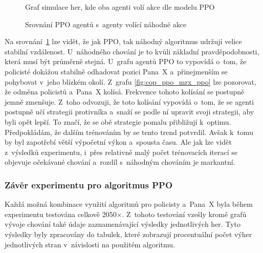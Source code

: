 \begin{figure}[H]
\begin{minipage}{.48\textwidth}
      \caption{Graf simulace her, kde oba agenti volí akce dle modelu PPO}
      \label{fig:cop_ppo_mrx_ppo}
  \end{minipage}
  \caption{Srovnání PPO agentů s~agenty volící náhodné akce}
  \label{fig:srovnani_random_ppo}
  \end{figure}

Na srovnání~\ref{fig:srovnani_random_ppo} lze vidět, že jak PPO, tak náhodný algoritmus udržují velice stabilní vzdálenost.
U~náhodného chování je to kvůli základní pravděpodobnosti, která musí být průměrně stejná.
U~grafu agentů PPO to vypovídá o~tom, že policisté dokážou stabilně odhadovat pozici Pana~X a~přinejmenším se pohybovat v~jeho blízkém okolí.
Z~grafu \ref{fig:cop_ppo_mrx_ppo} lze pozorovat, že odměna policistů a~Pana~X kolísá.
Frekvence tohoto kolísání se postupně jemně zmenšuje.
Z~toho odvozuji, že toto kolísání vypovídá o~tom, že se agenti postupně učí strategii protivníka a~snaží se podle ní upravit svoji strategii, aby byli opět lepší.
To značí, že se obě strategie pomalu přibližují k~optimu.
Předpokládám, že dalším trénováním by se tento trend potvrdil.
Avšak k~tomu by byl zapotřebí větší výpočetní výkon a~spousta času.
Ale jak lze vidět z~výsledků experimentu, i~přes relativně malý počet trénovacích iterací se objevuje očekávané chování a~rozdíl s~náhodným chováním je markantní.

\subsubsection*{Závěr experimentu pro algoritmus PPO}

Každá možná kombinace využití algoritmů pro policisty a~Pana~X byla během experimentu testována celkově 2050$\times$.
Z~tohoto testování vzešly kromě grafů vývoje chování také údaje zaznamenávající výsledky jednotlivých her.
Tyto výsledky byly zpracovány do tabulek, které zobrazují procentuální počet výher jednotlivých stran v~závislosti na použitém algoritmu.

